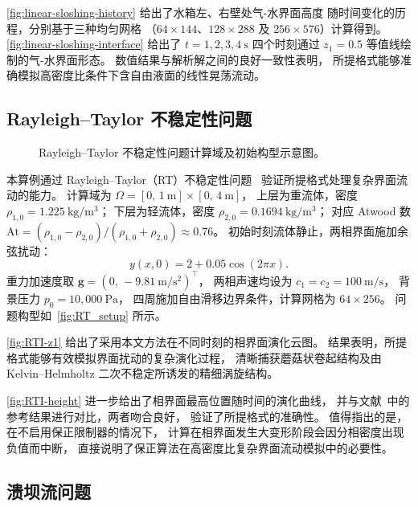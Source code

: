 \documentclass[12pt,a4paper]{article}
\numberwithin{equation}{section}    %
\begin{document}
\autoref{fig:linear-sloshing-history} 给出了水箱左、右壁处气-水界面高度
随时间变化的历程，分别基于三种均匀网格
（$64\times 144$、$128\times 288$ 及 $256\times 576$）计算得到。
\autoref{fig:linear-sloshing-interface} 给出了 $t = 1, 2, 3, 4~\mathrm{s}$
四个时刻通过 $z_1 = 0.5$ 等值线绘制的气-水界面形态。
数值结果与解析解之间的良好一致性表明，
所提格式能够准确模拟高密度比条件下含自由液面的线性晃荡流动。


\subsection{Rayleigh--Taylor 不稳定性问题}

\begin{figure}[!htbp]
    \centering
    
    \caption{Rayleigh--Taylor 不稳定性问题计算域及初始构型示意图。}
    \label{fig:RT_setup}
\end{figure}

本算例通过 Rayleigh--Taylor（RT）不稳定性问题~\cite{1997JCoPh.130..269P}
验证所提格式处理复杂界面流动的能力。
计算域为 $\Omega = [0,\,1~\mathrm{m}] \times [0,\,4~\mathrm{m}]$，
上层为重流体，密度 $\rho_{1,0} = 1.225~\mathrm{kg/m^3}$；
下层为轻流体，密度 $\rho_{2,0} = 0.1694~\mathrm{kg/m^3}$；
对应 Atwood 数
$\mathrm{At} = (\rho_{1,0} - \rho_{2,0})/(\rho_{1,0} + \rho_{2,0}) \approx 0.76$。
初始时刻流体静止，两相界面施加余弦扰动：
\begin{equation}
    y(x, 0) = 2 + 0.05\cos(2\pi x).
\end{equation}
重力加速度取 $\bm{g} = (0,\,-9.81~\mathrm{m/s^2})^\top$，
两相声速均设为 $c_1 = c_2 = 100~\mathrm{m/s}$，
背景压力 $p_0 = 10{,}000~\mathrm{Pa}$，
四周施加自由滑移边界条件，计算网格为 $64\times 256$。
问题构型如~\autoref{fig:RT_setup} 所示。

\autoref{fig:RTI-z1} 给出了采用本文方法在不同时刻的相界面演化云图。
结果表明，所提格式能够有效模拟界面扰动的复杂演化过程，
清晰捕获蘑菇状卷起结构及由 Kelvin--Helmholtz 二次不稳定所诱发的精细涡旋结构。

\autoref{fig:RTI-height} 进一步给出了相界面最高位置随时间的演化曲线，
并与文献~\cite{1997JCoPh.130..269P}中的参考结果进行对比，两者吻合良好，
验证了所提格式的准确性。
值得指出的是，在不启用保正限制器的情况下，
计算在相界面发生大变形阶段会因分相密度出现负值而中断，
直接说明了保正算法在高密度比复杂界面流动模拟中的必要性。


\subsection{溃坝流问题}
\end{document}
